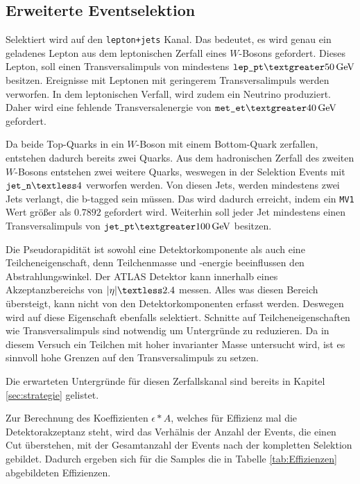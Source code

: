\subsection{Erweiterte Eventselektion}
\label{sec:aufgabe3}

Selektiert wird auf den \texttt{lepton+jets} Kanal. Das bedeutet, es wird genau 
ein geladenes Lepton aus dem leptonischen Zerfall eines $W$-Bosons gefordert. 
Dieses Lepton, soll einen Transversalimpuls von mindestens $\texttt{lep$\_$pt} \textgreater 
\SI{50}{\giga\electronvolt}$ besitzen. Ereignisse mit Leptonen mit geringerem Transversalimpuls 
werden verworfen. In dem leptonischen Verfall, wird zudem ein 
Neutrino produziert. Daher wird eine fehlende Transversalenergie von 
$\texttt{met$\_$et} \textgreater \SI{40}{\giga\electronvolt}$ gefordert. \par 
Da beide Top-Quarks in ein $W$-Boson mit einem Bottom-Quark zerfallen, entstehen
dadurch bereits zwei Quarks. Aus dem hadronischen Zerfall des zweiten $W$-Bosons 
entstehen zwei weitere Quarks, weswegen in der Selektion Events mit 
$\texttt{jet$\_$n} \textless 4$ verworfen werden. Von diesen Jets, werden 
mindestens zwei Jets verlangt, die b-tagged sein müssen. Das wird dadurch erreicht,
indem ein \texttt{MV1} Wert größer als $0.7892$ gefordert wird. Weiterhin soll 
jeder Jet mindestens einen Transversalimpuls von $\texttt{jet$\_$pt} 
\textgreater \SI{100}{\giga\electronvolt}$ besitzen. \par 
Die Pseudorapidität ist sowohl eine Detektorkomponente als auch eine 
Teilcheneigenschaft, denn Teilchenmasse und -energie beeinflussen den 
Abstrahlungswinkel. Der ATLAS Detektor kann innerhalb eines Akzeptanzbereichs 
von $|{\eta}| \textless 2.4$ messen. Alles was diesen Bereich übersteigt, 
kann nicht von den Detektorkomponenten erfasst werden. Deswegen wird auf 
diese Eigenschaft ebenfalls selektiert. Schnitte auf Teilcheneigenschaften 
wie Transversalimpuls sind notwendig um Untergründe zu reduzieren. Da in diesem 
Versuch ein Teilchen mit hoher invarianter Masse untersucht wird, ist es 
sinnvoll hohe Grenzen auf den Transversalimpuls zu setzen. \par 

Die erwarteten Untergründe für diesen Zerfallskanal sind bereits in 
Kapitel \ref{sec:strategie} gelistet. \par

Zur Berechnung des Koeffizienten $\epsilon * A$, welches für Effizienz mal die 
Detektorakzeptanz steht, wird das Verhälnis der Anzahl der Events, die einen 
Cut überstehen, 
mit der Gesamtanzahl der Events nach der kompletten Selektion gebildet. Dadurch 
ergeben sich für die Samples die in Tabelle \ref{tab:Effizienzen} abgebildeten 
Effizienzen.

